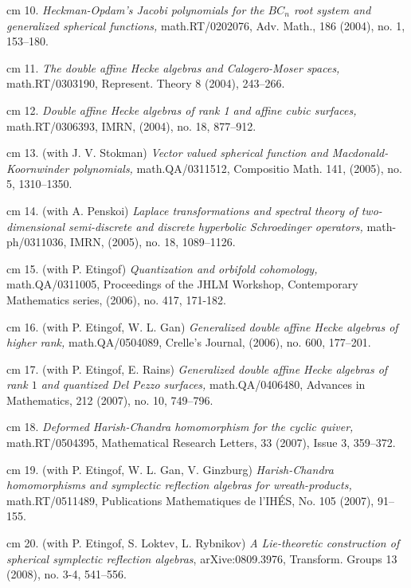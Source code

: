 \documentclass[11pt]{amsart}
\theoremstyle{plain}
\theoremstyle{definition}
\theoremstyle{remark}
\begin{document}
\noindent{} cm 10. {\it Heckman-Opdam's Jacobi
       polynomials for the $BC_n$ root system and
        generalized spherical functions,} math.RT/0202076,
        Adv. Math.,  186  (2004),  no. 1, 153--180.

\noindent{} cm 11. {\it The double affine Hecke
algebras and Calogero-Moser spaces,} math.RT/0303190,  Represent.
Theory 8 (2004), 243--266.

\noindent{} cm 12. {\it Double affine Hecke algebras of rank 1 and
affine cubic surfaces,} math.RT/0306393,  IMRN,  (2004),  no. 18,
877--912.

\noindent{} cm 13. (with J. V. Stokman)  {\it Vector valued spherical
function and Macdonald-Koornwinder polynomials,}  math.QA/0311512,
Compositio Math.
 141, (2005), no. 5,   1310--1350.



\noindent{} cm 14. (with A. Penskoi)
 {\it Laplace transformations and spectral theory of two-dimensional
semi-discrete and discrete hyperbolic Schroedinger operators,}
math-ph/0311036, IMRN,  (2005), no. 18, 1089--1126.


\noindent{} cm 15. (with P. Etingof)
{\it Quantization and orbifold cohomology,}
 math.QA/0311005, Proceedings of the JHLM Workshop,
 Contemporary Mathematics series, (2006), no. 417,  171-182.


\noindent{} cm 16. (with P. Etingof, W. L. Gan)
{\it Generalized double affine
Hecke algebras of higher rank,}  math.QA/0504089, Crelle's Journal,
(2006), no. 600, 177--201.



\noindent{} cm 17. (with P. Etingof, E. Rains)
{\it  Generalized double affine
Hecke algebras of rank $1$ and quantized Del Pezzo surfaces,}
math.QA/0406480, Advances in Mathematics, 212
(2007), no. 10, 749--796.


\noindent{} cm 18. {\it Deformed Harish-Chandra homomorphism for the
cyclic quiver,} math.RT/0504395, Mathematical Research Letters,
33 (2007), Issue 3, 359--372.

\noindent{} cm 19. (with P. Etingof, W. L. Gan, V. Ginzburg)
 {\it Ha\-rish-Cha\-n\-dra ho\-mo\-mor\-phisms and sym\-plec\-tic ref\-lec\-tion
algebras for wre\-ath-pro\-ducts,} math.RT/0511489, 
 Publications Mathematiques de l'IH\'ES,  No. 105  (2007), 91--155.


\noindent{} cm 20.
(with P. Etingof, S. Loktev, L. Rybnikov)
{\it A Lie-theoretic construction of spherical symplectic reflection algebras}, arXive:0809.3976,
  Transform. Groups  13  (2008),  no. 3-4, 541--556.
\end{document}

